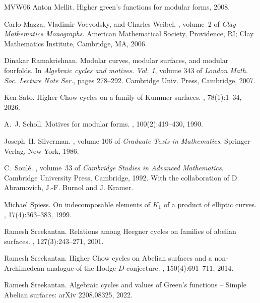 \documentclass[11pt,a4paper]{article}
\begin{document}
\begin{thebibliography}{MVW06}
Anton Mellit.
\newblock Higher green's functions for modular forms, 2008.

Carlo Mazza, Vladimir Voevodsky, and Charles Weibel.
, volume~2 of {\em Clay
  Mathematics Monographs}.
\newblock American Mathematical Society, Providence, RI; Clay Mathematics
  Institute, Cambridge, MA, 2006.

Dinakar Ramakrishnan.
\newblock Modular curves, modular surfaces, and modular fourfolds.
\newblock In {\em Algebraic cycles and motives. {V}ol. 1}, volume 343 of {\em
  London Math. Soc. Lecture Note Ser.}, pages 278--292. Cambridge Univ. Press,
  Cambridge, 2007.

Ken Sato.
\newblock Higher {C}how cycles on a family of {K}ummer surfaces.
, 78(1):1--34, 2026.

A.~J. Scholl.
\newblock Motives for modular forms.
, 100(2):419--430, 1990.

Joseph~H. Silverman.
, volume 106 of {\em Graduate
  Texts in Mathematics}.
\newblock Springer-Verlag, New York, 1986.

C.~Soul\'{e}.
, volume~33 of {\em Cambridge
  Studies in Advanced Mathematics}.
\newblock Cambridge University Press, Cambridge, 1992.
\newblock With the collaboration of D. Abramovich, J.-F. Burnol and J. Kramer.

Michael Spiess.
\newblock On indecomposable elements of {$K_1$} of a product of elliptic
  curves.
, 17(4):363--383, 1999.

Ramesh Sreekantan.
\newblock Relations among {H}eegner cycles on families of abelian surfaces.
, 127(3):243--271, 2001.

Ramesh Sreekantan.
\newblock Higher {C}how cycles on {A}belian surfaces and a non-{A}rchimedean
  analogue of the {H}odge-{$D$}-conjecture.
, 150(4):691--711, 2014.

Ramesh Sreekantan.
\newblock Algebraic cycles and values of {G}reen's functions -- {S}imple
  {A}belian surfaces: ar{X}iv 2208.08325, 2022.


\end{thebibliography}
\end{document}
